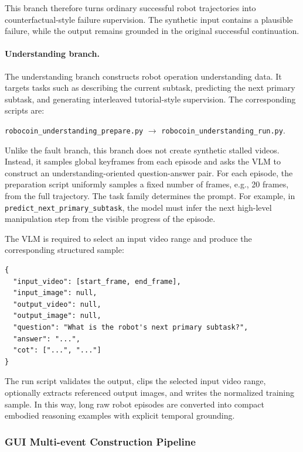 \documentclass{llmxive}
\begin{document}
This branch therefore turns ordinary successful robot trajectories into counterfactual-style failure supervision. The synthetic input contains a plausible failure, while the output remains grounded in the original successful continuation.

\paragraph{Understanding branch.}
The understanding branch constructs robot operation understanding data. It targets tasks such as describing the current subtask, predicting the next primary subtask, and generating interleaved tutorial-style supervision. The corresponding scripts are:
\begin{center}
\small
\texttt{robocoin\_understanding\_prepare.py}
$\rightarrow$
\texttt{robocoin\_understanding\_run.py}.
\end{center}

Unlike the fault branch, this branch does not create synthetic stalled videos. Instead, it samples global keyframes from each episode and asks the VLM to construct an understanding-oriented question-answer pair. For each episode, the preparation script uniformly samples a fixed number of frames, e.g., 20 frames, from the full trajectory. The task family determines the prompt. For example, in \texttt{predict\_next\_primary\_subtask}, the model must infer the next high-level manipulation step from the visible progress of the episode.

The VLM is required to select an input video range and produce the corresponding structured sample:
\begin{verbatim}
{
  "input_video": [start_frame, end_frame],
  "input_image": null,
  "output_video": null,
  "output_image": null,
  "question": "What is the robot's next primary subtask?",
  "answer": "...",
  "cot": ["...", "..."]
}
\end{verbatim}

The run script validates the output, clips the selected input video range, optionally extracts referenced output images, and writes the normalized training sample. In this way, long raw robot episodes are converted into compact embodied reasoning examples with explicit temporal grounding.

\subsubsection{GUI Multi-event Construction Pipeline}
\label{app:gui_pipeline}
\end{document}
